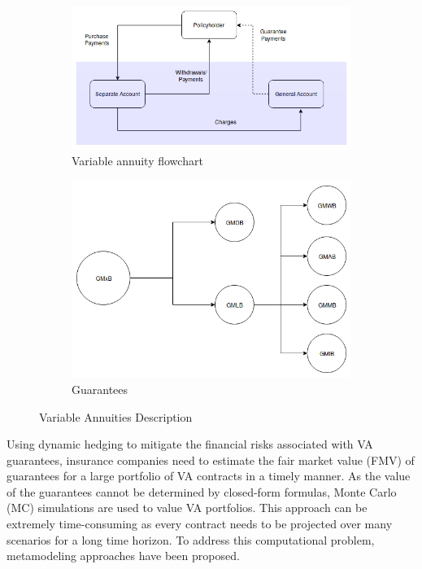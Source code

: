 \begin{figure}
  	\begin{subfigure}[b]{0.5\textwidth}
    \includegraphics[width=\textwidth]{pictures/novais1.png}
    \caption{Variable annuity flowchart}
    \label{fig:1}
  	\end{subfigure}
  	\begin{subfigure}[b]{0.5\textwidth}
    \includegraphics[width=\textwidth]{pictures/novais2.png}
    \caption{Guarantees}
    \label{fig:2}
  	\end{subfigure}
  	\caption{Variable Annuities Description}
\end{figure}


Using dynamic hedging to mitigate the financial risks associated with VA guarantees, insurance companies need to estimate the fair market value (FMV) of guarantees for a large portfolio of VA contracts in a timely manner. 
As the value of the guarantees cannot be determined by closed-form formulas, Monte Carlo (MC) simulations are used to value VA portfolios. This approach can be extremely time-consuming as every contract needs to be projected over many scenarios for a long time horizon. To address this computational problem, metamodeling approaches have been proposed.

